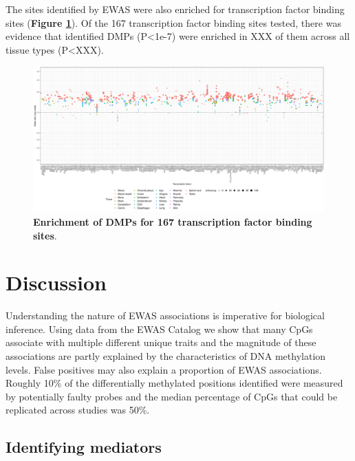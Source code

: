\documentclass[11pt,oneside]{bristolthesis}
\newcommand{\blandscape}{\begin{landscape}}
\newcommand{\elandscape}{\end{landscape}}
\begin{document}
The sites identified by EWAS were also enriched for transcription factor binding sites (\textbf{Figure \ref{fig:tfbs-plot}}). Of the 167 transcription factor binding sites tested, there was evidence that identified DMPs (P\textless1e-7) were enriched in XXX of them across all tissue types (P\textless XXX).





\blandscape
\begin{figure}

{\centering \includegraphics[width=1\linewidth]{figure/04-properties_of_ewas/cpg_corebg_matched_all_enrichment_All_OR} 

}

\caption[Enrichment of DMPs for 167 transcription factor binding sites]{\textbf{Enrichment of DMPs for 167 transcription factor binding sites}.}\label{fig:tfbs-plot}
\end{figure}
\elandscape

\newpage

\hypertarget{discussion-04}{%
\section{Discussion}\label{discussion-04}}

Understanding the nature of EWAS associations is imperative for biological inference. Using data from the EWAS Catalog we show that many CpGs associate with multiple different unique traits and the magnitude of these associations are partly explained by the characteristics of DNA methylation levels. False positives may also explain a proportion of EWAS associations. Roughly 10\% of the differentially methylated positions identified were measured by potentially faulty probes and the median percentage of CpGs that could be replicated across studies was 50\%.

\hypertarget{identifying-mediators}{%
\subsection{Identifying mediators}\label{identifying-mediators}}
\end{document}
